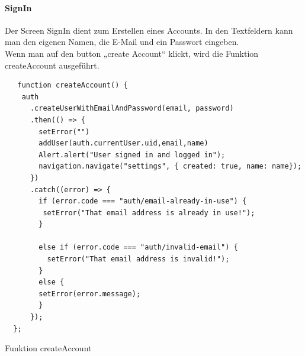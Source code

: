 \paragraph{SignIn}Der Screen SignIn dient zum Erstellen eines Accounts. In den Textfeldern kann man den eigenen Namen, die E-Mail und ein Passwort eingeben.\\
Wenn man auf den button „create Account“ klickt, wird die Funktion createAccount ausgeführt.\\
\begin{listing}[H]
  \begin{verbatim}
   function createAccount() {
    auth
      .createUserWithEmailAndPassword(email, password)
      .then(() => {
        setError("")
        addUser(auth.currentUser.uid,email,name)
        Alert.alert("User signed in and logged in");
        navigation.navigate("settings", { created: true, name: name});
      })
      .catch((error) => {
        if (error.code === "auth/email-already-in-use") {
         setError("That email address is already in use!");
        }

        else if (error.code === "auth/invalid-email") {
          setError("That email address is invalid!");
        }
        else {
        setError(error.message);
        }
      });
  };
\end{verbatim}
  \caption{Funktion createAccount}
  \label{lst:createaccount}
\end{listing}

